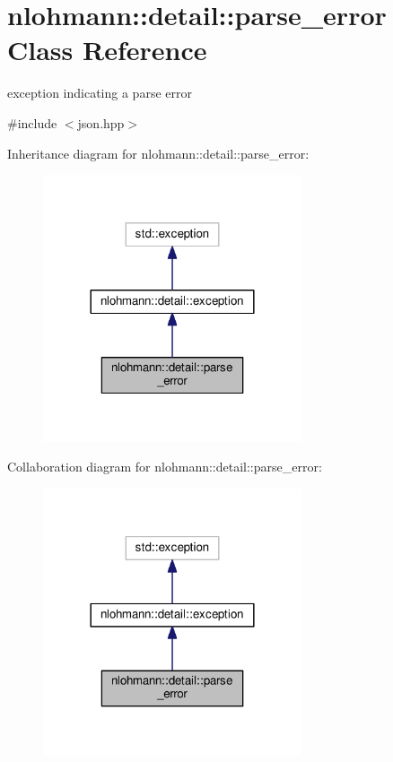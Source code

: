 \hypertarget{classnlohmann_1_1detail_1_1parse__error}{}\section{nlohmann\+:\+:detail\+:\+:parse\+\_\+error Class Reference}
\label{classnlohmann_1_1detail_1_1parse__error}


exception indicating a parse error  




{\ttfamily \#include $<$json.\+hpp$>$}



Inheritance diagram for nlohmann\+:\+:detail\+:\+:parse\+\_\+error\+:\nopagebreak
\begin{figure}[H]
\begin{center}
\leavevmode
\includegraphics[width=216pt]{classnlohmann_1_1detail_1_1parse__error__inherit__graph}
\end{center}
\end{figure}


Collaboration diagram for nlohmann\+:\+:detail\+:\+:parse\+\_\+error\+:\nopagebreak
\begin{figure}[H]
\begin{center}
\leavevmode
\includegraphics[width=216pt]{classnlohmann_1_1detail_1_1parse__error__coll__graph}
\end{center}
\end{figure}
